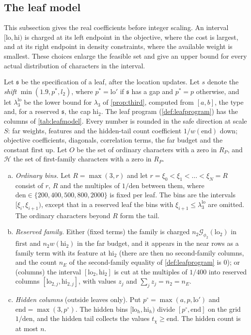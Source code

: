 \documentclass[11pt]{amsart}
\numberwithin{equation}{section}
\theoremstyle{plain}
\theoremstyle{definition}
\theoremstyle{remark}
\newcommand{\lo}{\mathrm{lo}}
\newcommand{\hi}{\mathrm{hi}}
\newcommand{\1}{\mathbf{1}}
\begin{document}
\subsection{The leaf model}\label{subsec:leafmodel}
This subsection gives the real coefficients before integer scaling. An interval
$[\lo,\hi)$ is charged at its left endpoint in the objective, where the cost is
largest, and at its right endpoint in density constraints, where the available
weight is smallest. These choices enlarge the feasible set and give an upper bound
for every actual distribution of characters in the interval.

Let $\mathfrak s$ be the specification of a leaf, after the location updates. Let $s$ denote the
\emph{shift} $\min(1.9,p^*,l_2)$, where $p^*=\lo'$ if $\mathfrak s$ has a gap and $p^*=p$ otherwise, and let
$\lambda_3^{\lo}$ be the lower bound for $\lambda_3$ of \cref{prop:third}, computed from $[a,b]$, the
type and, for a reserved $\mathfrak s$, the cap $\hi_2$. The leaf program (\cref{def:leafprogram}) has the
columns of \cref{tab:leafmodel}. Every number is rounded in the safe direction at scale $S$: far weights,
features and the hidden-tail count coefficient $1/w(\mathrm{end})$ down; objective coefficients,
diagonals, correlation terms, the far budget and the constant $\mathrm{first}$ up. Let $O$ be the set
of ordinary characters with a zero in $R_P$, and $\mathcal H$ the set of first-family characters with a
zero in $R_P$.
\begin{enumerate}[(a)]
  \item \emph{Ordinary bins.} Let $R=\max(3,r)$ and let $r=\xi_0<\xi_1<\dots<\xi_N=R$ consist of $r$,
    $R$ and the multiples of $1/\mathrm{den}$ between them, where $\mathrm{den}\in\{200,400,500,800,2000\}$
    is fixed per leaf. The bins are the intervals $[\xi_i,\xi_{i+1})$, except that in a reserved leaf the
    bins with $\xi_{i+1}\le\lambda_3^{\lo}$ are omitted. The ordinary characters beyond $R$ form the tail.
  \item \emph{Reserved family.} Either (fixed terms) the family is charged $n_2\mathcal G_{\phi_2}(\lo_2)$ in
    $\mathrm{first}$ and $n_2w(\hi_2)$ in the far budget, and it appears in the near rows as a family
    term with its feature at $\hi_2$ (there are then no second-family columns, and the count $n_E$ of the
    second-family equality of \cref{def:leafprogram} is $0$); or (columns) the interval $[\lo_2,\hi_2]$ is cut
    at the multiples of $1/400$ into reserved columns $[\lo_{2,j},\hi_{2,j}]$, with values $z_j$ and
    $\sum_jz_j=n_2=n_E$.
  \item \emph{Hidden columns} (outside leaves only). Put $p^\circ=\max(a,p,\lo')$ and
    $\mathrm{end}=\max(3,p^\circ)$. The hidden bins $[\lo_h,\hi_h)$ divide $[p^\circ,\mathrm{end}]$ on the grid
    $1/\mathrm{den}$, and the hidden tail collects the values $t_\chi\ge\mathrm{end}$. The hidden count is at
    most $n$.
\end{enumerate}
\end{document}
